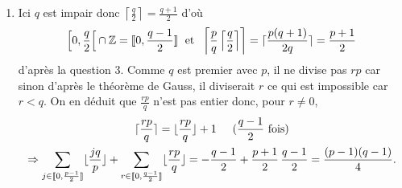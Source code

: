 \begin{enumerate}
\begin{enumerate}
    \item Ici $q$ est impair donc $\left\lceil \frac{q}{2}\right\rceil = \frac{q+1}{2}$ d'où
\[
  \left[ 0, \frac{q}{2}\right[ \cap \mathbb{Z} = \llbracket 0, \frac{q-1}{2}\rrbracket\; \text{ et }\;
  \left\lceil \frac{p}{q}\left\lceil \frac{q}{2}\right\rceil\right\rceil = \lceil \frac{p(q+1)}{2q} \rceil = \frac{p+1}{2}
\]
d'après la question 3.\newline
    Comme $q$ est premier avec $p$, il ne divise pas $rp$ car sinon d'après le théorème de Gauss, il diviserait $r$ ce qui est impossible car $r < q$. On en déduit que $\frac{rp}{q}$ n'est pas entier donc, pour $r \neq 0$,
\begin{multline*}
  \lceil \frac{rp}{q} \rceil =  \lfloor \frac{rp}{q} \rfloor + 1 \hspace{0.5cm} ( \frac{q-1}{2} \text{ fois})\\
  \Rightarrow
 \sum_{j \in \llbracket 0, \frac{p-1}{2}\rrbracket}\lfloor \frac{jq}{p}\rfloor + \sum_{r \in \llbracket 0, \frac{q-1}{2}\rrbracket} \lfloor \frac{rp}{q}\rfloor 
= - \frac{q-1}{2} + \frac{p+1}{2} \, \frac{q-1}{2}
= \frac{(p-1)(q-1)}{4}.
\end{multline*}
  \end{enumerate}
\end{enumerate}


